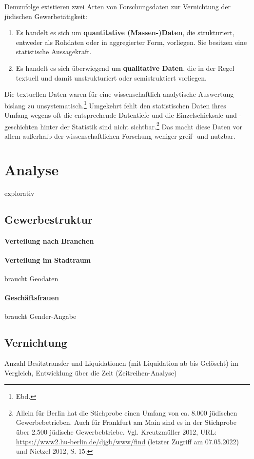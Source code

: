 Demzufolge existieren zwei Arten von Forschungsdaten zur Vernichtung der jüdischen Gewerbetätigkeit:

\begin{enumerate}
    \item Es handelt es sich um \textbf{quantitative (Massen-)Daten}, die strukturiert, entweder als Rohdaten oder in aggregierter Form, vorliegen. Sie besitzen eine statistische Aussagekraft.
    \item Es handelt es sich überwiegend um \textbf{qualitative Daten}, die in der Regel textuell und damit unstrukturiert oder semistruktiert vorliegen.
\end{enumerate}

Die textuellen Daten waren für eine wissenschaftlich analytische Auswertung bislang zu unsystematisch.\footnote{Ebd.} Umgekehrt fehlt den statistischen Daten ihres Umfang wegens oft die entsprechende Datentiefe und die Einzelschicksale und -geschichten hinter der Statistik sind nicht sichtbar.\footnote{Allein für Berlin hat die Stichprobe einen Umfang von ca. 8.000 jüdischen Gewerbebetrieben. Auch für Frankfurt am Main sind es in der Stichprobe über 2.500 jüdische Gewerbebtriebe. Vgl. Kreutzmüller 2012, URL: \url{https://www2.hu-berlin.de/djgb/www/find} (letzter Zugriff am 07.05.2022) und Nietzel 2012, S. 15.} Das macht diese Daten vor allem außerhalb der wissenschaftlichen Forschung weniger greif- und nutzbar. 

\section{Analyse}
explorativ
\subsection{Gewerbestruktur}
\paragraph{Verteilung nach Branchen}
\paragraph{Verteilung im Stadtraum}
braucht Geodaten
\paragraph{Geschäftsfrauen}
braucht Gender-Angabe
\subsection{Vernichtung}
Anzahl Besitztransfer und Liquidationen (mit Liquidation ab bis Gelöscht) im Vergleich, Entwicklung über die Zeit (Zeitreihen-Analyse)
